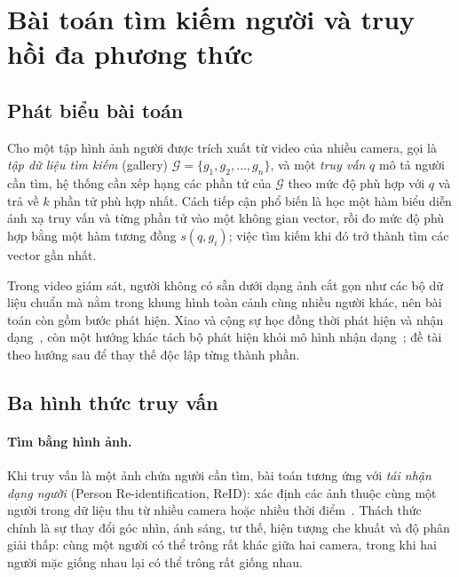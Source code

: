 \section{Bài toán tìm kiếm người và truy hồi đa phương thức}
\label{sec:3.1}

\subsection{Phát biểu bài toán}
\label{sec:3.1.1}

Cho một tập hình ảnh người được trích xuất từ video của nhiều camera, gọi là \emph{tập dữ liệu tìm kiếm} (gallery) $\mathcal{G} = \{g_1, g_2, \ldots, g_n\}$, và một \emph{truy vấn} $q$ mô tả người cần tìm, hệ thống cần xếp hạng các phần tử của $\mathcal{G}$ theo mức độ phù hợp với $q$ và trả về $k$ phần tử phù hợp nhất. Cách tiếp cận phổ biến là học một hàm biểu diễn ánh xạ truy vấn và từng phần tử vào một không gian vector, rồi đo mức độ phù hợp bằng một hàm tương đồng $s(q, g_i)$; việc tìm kiếm khi đó trở thành tìm các vector gần nhất.

Trong video giám sát, người không có sẵn dưới dạng ảnh cắt gọn như các bộ dữ liệu chuẩn mà nằm trong khung hình toàn cảnh cùng nhiều người khác, nên bài toán còn gồm bước phát hiện. Xiao và cộng sự học đồng thời phát hiện và nhận dạng~\cite{xiao2017personsearch}, còn một hướng khác tách bộ phát hiện khỏi mô hình nhận dạng~\cite{zheng2017reidwild}; đề tài theo hướng sau để thay thế độc lập từng thành phần.

\subsection{Ba hình thức truy vấn}
\label{sec:3.1.2}
\label{sec:3.1.3}
\label{sec:3.1.4}

\paragraph{Tìm bằng hình ảnh.} Khi truy vấn là một ảnh chứa người cần tìm, bài toán tương ứng với \emph{tái nhận dạng người} (Person Re-identification, ReID): xác định các ảnh thuộc cùng một người trong dữ liệu thu từ nhiều camera hoặc nhiều thời điểm~\cite{ye2022reidsurvey}. Thách thức chính là sự thay đổi góc nhìn, ánh sáng, tư thế, hiện tượng che khuất và độ phân giải thấp: cùng một người có thể trông rất khác giữa hai camera, trong khi hai người mặc giống nhau lại có thể trông rất giống nhau.

